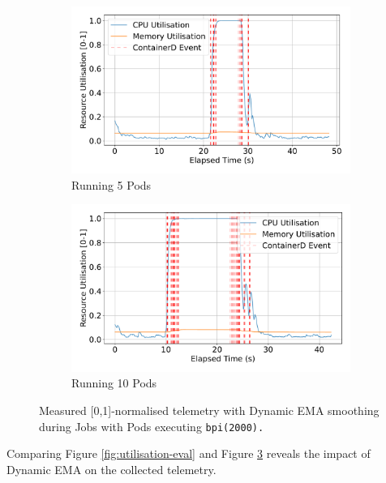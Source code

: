 \begin{figure}[ht!]
    \begin{subfigure}[b]{0.48\textwidth}
        \centering
        \includegraphics[width=\linewidth]{images/filter-utilisation-smallbatch.pdf}
        \caption{Running 5 Pods} %
        \label{fig:filter-utilisation-smallbatch}
    \end{subfigure}%
    \hfill
    \begin{subfigure}[b]{0.48\textwidth}
        \centering
        \includegraphics[width=\linewidth]{images/filter-utilisation-bigbatch.pdf}
        \caption{Running 10 Pods} %
        \label{fig:filter-utilisation-bigbatch}
    \end{subfigure}

    \caption{Measured [0,1]-normalised telemetry with Dynamic EMA smoothing
    during Jobs with Pods executing \texttt{bpi(2000).}}
    \label{fig:filtered-metrics-eval}
\end{figure}

Comparing Figure \ref{fig:utilisation-eval} and Figure
\ref{fig:filtered-metrics-eval} reveals the impact of Dynamic EMA on the
collected telemetry.


